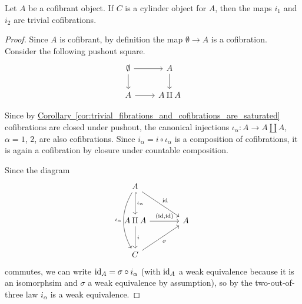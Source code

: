\documentclass[main.tex]{subfiles}
\begin{document}
\begin{lemma}
  \label{lemma:cylinder_injections_are_trivial_cofibrations}
  Let $A$ be a cofibrant object. If $C$ is a cylinder object for $A$, then the maps $i_{1}$ and $i_{2}$ are trivial cofibrations.
\end{lemma}
\begin{proof}
  Since $A$ is cofibrant, by definition the map $\emptyset \to A$ is a cofibration. Consider the following pushout square.
  \begin{equation*}
    \begin{tikzcd}
      \emptyset
      \arrow[r]
      \arrow[d]
      & A
      \arrow[d]
      \\
      A
      \arrow[r]
      & A \amalg A
    \end{tikzcd}
  \end{equation*}

  Since by \hyperref[cor:trivial_fibrations_and_cofibrations_are_saturated]{Corollary~\ref*{cor:trivial_fibrations_and_cofibrations_are_saturated}} cofibrations are closed under pushout, the canonical injections $\iota_{\alpha}\colon A \to A \amalg A$, $\alpha = 1$, $2$, are also cofibrations. Since $i_{\alpha} = i \circ \iota_{\alpha}$ is a composition of cofibrations, it is again a cofibration by closure under countable composition.

  Since the diagram
  \begin{equation*}
    \begin{tikzcd}[row sep=large, column sep=large]
      A
      \arrow[d, hookrightarrow, "\iota_{\alpha}"]
      \arrow[rd, "\id"]
      \arrow[dd, bend right, swap, "\iota_{\alpha}"]
      \\
      A \amalg A
      \arrow[r, "{(\id, \id)}"]
      \arrow[d, "i"]
      & A
      \\
      C
      \arrow[ur, swap, "\sigma"]
    \end{tikzcd}
  \end{equation*}
  commutes, we can write $\mathrm{id}_{A} = \sigma \circ i_{\alpha}$ (with $\mathrm{id}_{A}$ a weak equivalence because it is an isomorphsim and $\sigma$ a weak equivalence by assumption), so by the two-out-of-three law $i_{\alpha}$ is a weak equivalence.
\end{proof}
\end{document}
